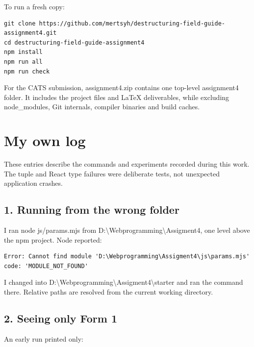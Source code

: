 \documentclass[10pt,a4paper]{article}
\begin{document}

To run a fresh copy:

\begin{lstlisting}[language={}]
git clone https://github.com/mertsyh/destructuring-field-guide-assignment4.git
cd destructuring-field-guide-assignment4
npm install
npm run all
npm run check
\end{lstlisting}

For the CATS submission, assignment4.zip contains one top-level assignment4 folder. It includes the project files and LaTeX deliverables, while excluding node\_modules, Git internals, compiler binaries and build caches.

\section{My own log}

These entries describe the commands and experiments recorded during this work. The tuple and React type failures were deliberate tests, not unexpected application crashes.

\subsection{1. Running from the wrong folder}


I ran node js/params.mjs from D:\textbackslash{}Webprogramming\textbackslash{}Assigment4, one level above the npm project. Node reported:

\begin{lstlisting}[language={}]
Error: Cannot find module 'D:\Webprogramming\Assigment4\js\params.mjs'
code: 'MODULE_NOT_FOUND'
\end{lstlisting}

I changed into D:\textbackslash{}Webprogramming\textbackslash{}Assigment4\textbackslash{}starter and ran the command there. Relative paths are resolved from the current working directory.

\subsection{2. Seeing only Form 1}


An early run printed only:
\end{document}
